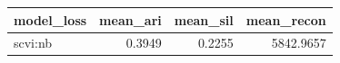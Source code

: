 \begin{tabular}{lrrr}
\toprule
model\_loss & mean\_ari & mean\_sil & mean\_recon \\
\midrule
scvi:nb & 0.3949 & 0.2255 & 5842.9657 \\
\bottomrule
\end{tabular}
